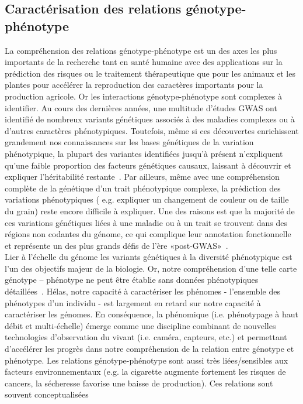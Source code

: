 \subsection{Caractérisation des relations génotype-phénotype}
 La compréhension des relations génotype-phénotype est un des axes les plus importants de la recherche tant en santé humaine avec des applications sur la prédiction des risques ou le traitement thérapeutique que pour les animaux et les plantes pour accélérer la reproduction des caractères importants pour la production agricole. Or les interactions génotype-phénotype sont complexes à identifier. Au cours des dernières années, une multitude d'études GWAS ont identifié de nombreux variants génétiques associés à des maladies complexes ou à d'autres caractères phénotypiques. Toutefois, même si ces découvertes enrichissent grandement nos connaissances sur les bases génétiques de la variation phénotypique, la plupart des variantes identifiées jusqu’à présent n’expliquent qu'une faible proportion des facteurs génétiques causaux, laissant à découvrir et expliquer l'héritabilité restante~\cite{manolio2009}. Par ailleurs, même avec une compréhension complète de la génétique d'un trait phénotypique complexe, la prédiction des variations phénotypiques ( e.g. expliquer un changement de couleur ou de taille du grain) reste encore difficile à expliquer. Une des raisons est que la majorité de ces variations génétiques liées à une maladie ou à un trait se trouvent dans des régions non codantes du génome, ce qui complique leur annotation fonctionnelle et représente un des plus grands défis de l’ère «post-GWAS»~\cite{freedman2011,Hou2013a}.\\
 
 Lier à l'échelle du génome les variants génétiques à la diversité phénotypique est l’un des objectifs majeur de la biologie. Or, notre compréhension d'une telle carte génotype – phénotype ne peut être établie sans données phénotypiques détaillées~\cite{houle2010}. Hélas, notre capacité à caractériser les phénomes - l'ensemble des phénotypes d'un individu - est largement en retard sur notre capacité à caractériser les génomes. En conséquence, la phénomique (i.e. phénotypage à haut débit et multi-échelle) émerge comme une discipline combinant de nouvelles technologies d'observation du vivant (i.e. caméra, capteurs, etc.) et permettant d’accélérer les progrès dans notre compréhension de la relation entre génotype et phénotype.
 Les relations génotype-phénotype sont aussi très liées/sensibles aux facteurs environnementaux (e.g. la cigarette augmente fortement les risques de cancers, la sécheresse favorise une baisse de production). Ces relations sont souvent conceptualisées \\ 

